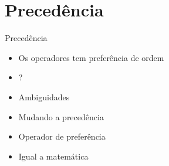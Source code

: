 \documentclass[11pt]{beamer}
\begin{document}
	\section{Precedência}
	\begin{frame}{Precedência}
		\only<1>
		{
			\begin{itemize}
				\presentationPause\item Os operadores tem preferência de ordem
				\presentationPause\item {} ?
			\end{itemize}
			\presentationPause
			\presentationPause
		}
		{

			\begin{itemize}
				\presentationPause\item Ambiguidades
				\presentationPause\item Mudando a precedência
				\presentationPause\item Operador de preferência
				\presentationPause\item Igual a matemática
			\end{itemize}
		}
		{
			\begin{table}[!h]
				\tiny\centering
				\caption{Ordem de precedência de operadores}
			

\end{table}}
\end{frame}
\end{document}
